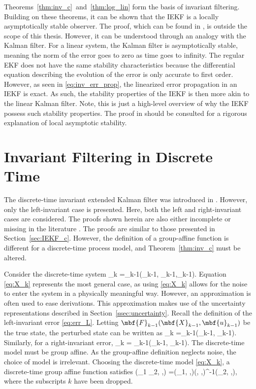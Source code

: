Theorems~\ref{thm:inv_c}~and~\ref{thm:log_lin} form the basis of invariant filtering. Building on these theorems, it can be shown that the IEKF is a locally asymptotically stable observer. The proof, which can be found in \cite{Barrau2017}, is outside the scope of this thesis. However, it can be understood through an analogy with the Kalman filter. For a linear system, the Kalman filter is asymptotically stable, meaning the norm of the error goes to zero as time goes to infinity. The regular EKF does not have the same stability characteristics because the differential equation describing the evolution of the error is only accurate to first  order. However, as seen in \eqref{eq:inv_err_prop}, the linearized error propagation in an IEKF is exact. As such, the stability properties of the IEKF is then more akin to the linear Kalman filter. Note, this is just a high-level overview of why the IEKF possess such stability properties. The proof in \cite{Barrau2017} should be consulted for a rigorous explanation of local asymptotic stability. 

\section{Invariant Filtering in Discrete Time}

The discrete-time invariant extended Kalman filter was introduced in \cite{Barrau2018}. However, only the left-invariant case is presented. Here, both the left and right-invariant cases are considered. The proofs shown herein are also either incomplete or missing in the literature \cite{Chauchat2018,persComm2017}. The proofs are similar to those presented in Section~\ref{sec:IEKF_c}. However, the definition of a group-affine function is different for a discrete-time process model, and Theorem~\ref{thm:inv_c} must be altered. 

Consider the discrete-time system
\beq
	_k =_{k-1}(_{k-1}, _{k-1},_{k-1}). \label{eq:X_k}
\eeq
Equation \eqref{eq:X_k} represents the most general case, as using \eqref{eq:X_k} allows for the noise to enter the system in a physically meaningful way. However, an approximation is often used to ease derivations. This approximation makes use of the uncertainty representations described in Section~\ref{ssec:uncertainty}. Recall the definition of the left-invariant error \eqref{eq:err_L}. Letting $\mbf{F}_{k-1}(\mbf{X}_{k-1}, \mbf{u}_{k-1})$ be the true state, the perturbed state can be written as
\beq
	_k =_{k-1}(_{k-1}, _{k-1}). \label{eq:X_k_L} 
\eeq
Similarly, for a right-invariant error,
\beq
	_k = _{k-1}(_{k-1}, _{k-1}). \label{eq:X_k_R} 
\eeq
The discrete-time model must be group affine. As the group-affine definition neglects noise, the choice of model is irrelevant. Choosing the discrete-time model \eqref{eq:X_k}, a discrete-time group affine function satisfies 
\beq
	\left(_1 _2, ,\right) =\left(_1, ,\right)\left(, ,\right)^{-1}\left(_2, ,\right), \label{eq:inv_rel_dis}
\eeq
where the subscripts $k$ have been dropped. 

